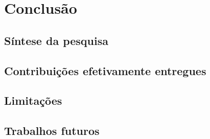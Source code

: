 \chapter{Conclusão}
\label{cap:conclusao}



\section{Síntese da pesquisa}
\label{sec:sintese}



\section{Contribuições efetivamente entregues}
\label{sec:contribuicoes_entregues}



\section{Limitações}
\label{sec:limitacoes}



\section{Trabalhos futuros}
\label{sec:trabalhos_futuros}

